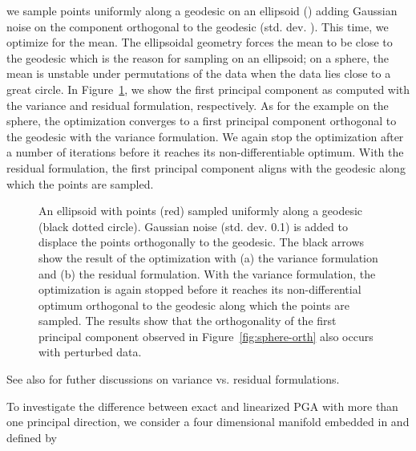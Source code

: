 \documentclass[final]{svjour3}
\begin{document}
we sample points uniformly along a geodesic on an ellipsoid ()
adding Gaussian noise on the component orthogonal to the geodesic (std. dev.
). This time, we optimize for the mean. The ellipsoidal geometry forces the mean
to be close to the geodesic which is the reason for sampling on an ellipsoid; on a
sphere, the mean is unstable under permutations of the data when the data lies
close to a great circle. In
Figure~\ref{fig:ellipsoid-orth}, we show the first principal component as
computed with the variance and residual formulation, respectively.
As for the example on the sphere, the optimization
converges to a first principal component orthogonal to the geodesic with the
variance formulation. We again stop the optimization after a number of iterations
before it reaches its non-differentiable optimum.
With the residual formulation, the first principal
component aligns with the geodesic along which the points are sampled.
\begin{figure}[h]
    \begin{center}
    \end{center}
    \caption{An ellipsoid  with points (red) sampled uniformly along a geodesic
    (black dotted circle). Gaussian noise
    (std. dev. 0.1) is added to displace the points orthogonally to the
    geodesic.
    The black arrows show
    the result of the optimization with (a) the variance formulation and (b) the
    residual formulation. 
    With the variance formulation, the optimization is again
    stopped before it reaches its non-differential optimum orthogonal to
    the geodesic along which the points are sampled.
    The results show that the orthogonality of the first principal component
    observed in Figure~\ref{fig:sphere-orth} also occurs with perturbed data.}
    \label{fig:ellipsoid-orth}
\end{figure}
See also \cite{huckemann_intrinsic_2010} for futher
discussions on variance vs. residual formulations.

To investigate the difference between exact and linearized PGA with more than one principal direction, we consider
a four dimensional manifold embedded in  and defined by
\end{document}
